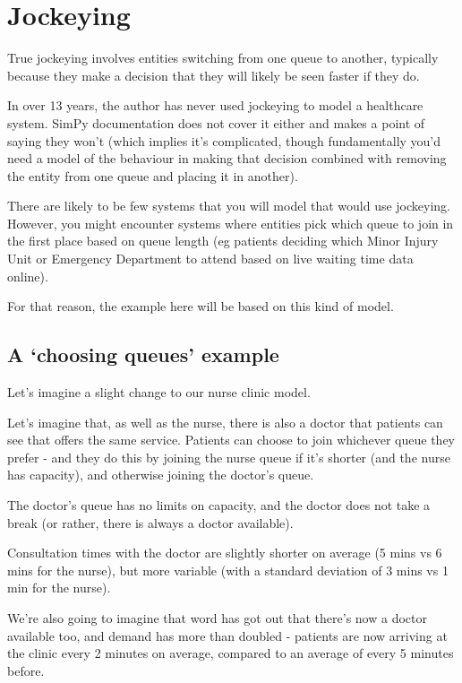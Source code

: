 \documentclass[
  letterpaper,
  DIV=11,
  numbers=noendperiod]{scrreprt}
\begin{document}
\section{Jockeying}\label{jockeying}

True jockeying involves entities switching from one queue to another,
typically because they make a decision that they will likely be seen
faster if they do.

In over 13 years, the author has never used jockeying to model a
healthcare system. SimPy documentation does not cover it either and
makes a point of saying they won't (which implies it's complicated,
though fundamentally you'd need a model of the behaviour in making that
decision combined with removing the entity from one queue and placing it
in another).

There are likely to be few systems that you will model that would use
jockeying. However, you might encounter systems where entities pick
which queue to join in the first place based on queue length (eg
patients deciding which Minor Injury Unit or Emergency Department to
attend based on live waiting time data online).

For that reason, the example here will be based on this kind of model.

\subsection{A `choosing queues'
example}\label{a-choosing-queues-example}

Let's imagine a slight change to our nurse clinic model.

Let's imagine that, as well as the nurse, there is also a doctor that
patients can see that offers the same service. Patients can choose to
join whichever queue they prefer - and they do this by joining the nurse
queue if it's shorter (and the nurse has capacity), and otherwise
joining the doctor's queue.

The doctor's queue has no limits on capacity, and the doctor does not
take a break (or rather, there is always a doctor available).

Consultation times with the doctor are slightly shorter on average (5
mins vs 6 mins for the nurse), but more variable (with a standard
deviation of 3 mins vs 1 min for the nurse).

We're also going to imagine that word has got out that there's now a
doctor available too, and demand has more than doubled - patients are
now arriving at the clinic every 2 minutes on average, compared to an
average of every 5 minutes before.
\end{document}
